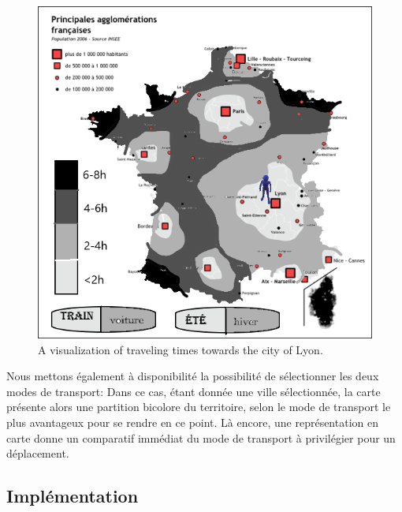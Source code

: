 \documentclass{vgtc}                          %
\begin{document}
\begin{figure}[tb]
 \centering %
 \includegraphics[scale=1, width=\columnwidth]{carte-france23.png}
 \caption{A visualization of traveling times towards the city of Lyon.}
 \label{fig:sample}
\end{figure}



Nous mettons également à disponibilité la possibilité de sélectionner les deux modes de transport: Dans ce cas, étant donnée une ville sélectionnée, la carte présente alors une partition bicolore du territoire, selon le mode de transport le plus avantageux pour se rendre en ce point. Là encore, une représentation en carte donne un comparatif immédiat du mode de transport à privilégier pour un déplacement.

\subsection{Implémentation}
\end{document}
